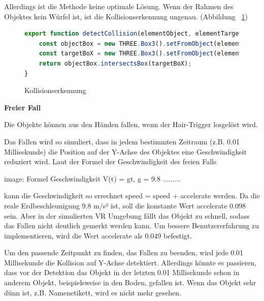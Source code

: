   Allerdings ist die Methode keine optimale Lösung. Wenn der Rahmen des Objektes kein Würfel ist, ist die Kollisionserkennung ungenau. (Abbildung ~\ref{fig:collisionDetection})
  
\begin{figure}[ht]
\vspace*{1em}
\centering
\caption[Kollisionserkennung]{Kollisionserkennung}
\begin{lstlisting}[language=JavaScript, style=htmlcssjs]
export function detectCollision(elementObject, elementTarget) {
    const objectBox = new THREE.Box3().setFromObject(elementObject.object3D);
    const targetBoX = new THREE.Box3().setFromObject(elementTarget.object3D);
    return objectBox.intersectsBox(targetBoX);
}
\end{lstlisting}
\label{fig:collisionDetection} 
\end{figure}
  
  \vspace{1em}
  \noindent
  \textbf{Freier Fall}
  \vspace{1em}
  
  \noindent
  Die Objekte können aus den Händen fallen, wenn der Hair-Trigger losgelöst wird.
  
  Das Fallen wird so simuliert, dass in jedem bestimmten Zeitraum (z.B. 0.01 Millisekunde) die Position auf der Y-Achse des Objektes eine Geschwindigkeit reduziert wird. Laut der Formel der Geschwindigkeit des freien Falls 
  
  image: Formel Geschwindigkeit V(t) = gt, g = 9.8 .........
  
  kann die Geschwindigkeit so errechnet {\selectfont speed = speed + accelerate} werden.
  Da die reale Erdbeschleunigung 9.8 m/s² ist, soll die konstante Wert {\selectfont accelerate} 0.098 sein. Aber in der simulierten VR Umgebung fällt das Objekt zu schnell, sodass das Fallen nicht deutlich gemerkt werden kann. Um bessere Benutzererfahrung zu implementieren, wird die Wert {\selectfont accelerate} als 0.049 befestigt.
  
  Um den passende Zeitpunkt zu finden, das Fallen zu beenden, wird jede 0.01 Millisekunde die Kollision auf Y-Achse detektiert. Allerdings könnte es passieren, dass vor der Detektion das Objekt in der letzten 0.01 Millisekunde schon in anderem Objekt, beispielsweise in den Boden, gefallen ist. Wenn das Objekt sehr dünn ist, z.B. Namenetikett, wird es nicht mehr gesehen.
  
